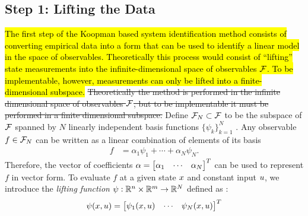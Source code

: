 \subsection{Step 1: Lifting the Data}   \label{sec:step1}

\hl{
The first step of the Koopman based system identification method consists of converting empirical data into a form that can be used to identify a linear model in the space of observables.
Theoretically this process would consist of ``lifting'' state measurements into the infinite-dimensional space of observables $\mathcal{F}$.
To be implementable, however, measurements can only be lifted into a finite-dimensional subspace.
}
\sout{
Theoretically the method  is performed in the infinite dimensional space of observables $\mathcal{F}$, but to be implementable it must be performed in a finite dimensional subspace.}
Define $\mathcal{F}_N \subset \mathcal{F}$ to be the subspace of $\mathcal{F}$ spanned by $N$ linearly independent basis functions $\{ \psi_k \}_{k=1}^N$ 
.
%
Any observable ${f \in \mathcal{F}_N}$ can be written as a linear combination of elements of its basis
\begin{align}
    f &= \alpha_1 \psi_{1} + \cdots + \alpha_N \psi_N.
\end{align}
Therefore, the vector of coefficients ${\alpha = \begin{bmatrix} \alpha_1 & \cdots & \alpha_N \end{bmatrix}^T}$ can be used to represent $f$ in vector form.
To evaluate $f$ at a given state $x$ and constant input $u$, we introduce the \emph{lifting function} ${\psi}:\mathbb{R}^n \times \mathbb{R}^m \to \mathbb{R}^N$ defined as :
\begin{align}
    {\psi}(x, u) = \begin{bmatrix}  \psi_1(x, u) & \cdots & \psi_N(x, u) \end{bmatrix}^T
    \label{eq:lift}
\end{align}
